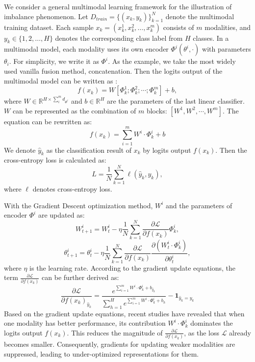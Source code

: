 We consider a general multimodal learning framework for the illustration of imbalance phenomenon. Let $D_{train} = \{(x_k,y_k)\}_{k=1}^{N}$ denote the multimodal training dataset. Each sample $x_k = (x_k^1,x_k^2, \dots,x_k^m)$ consists of $m$ modalities, and $y_k \in \{1,2,\dots,H\}$ denotes the corresponding class label from $H$ classes.
In a multimodal model, each modality uses its own encoder $\Phi^i(\theta^i,\cdot)$ with parameters $\theta_i$. For simplicity, we write it as $\Phi^i$.
As the example, we take the most widely used vanilla fusion method, concatenation. Then the logits output of the multimodal model can be written as :
\begin{equation} \label{equ:1}
    f(x_k) = W[\Phi_k^1;\Phi_k^2;\cdots;\Phi_k^m] + b,
\end{equation}
where $W \in \mathbb{R}^{H \times \sum_i^m d_{\Phi^i}}$ and $b \in \mathbb{R}^{H}$ are the parameters of the last linear classifier. $W$ can be represented as the combination of $m$ blocks: $[W^1,W^2,\cdots,W^m]$. The equation can be rewritten as: 
\begin{equation}
    f(x_k) = \sum_{i=1}^m W^i \cdot \Phi_k^i + b    
\end{equation}
We denote $\hat{y}_k$ as the classification result of $x_k$ by logits output $f(x_k)$. Then the cross-entropy loss is calculated as:
\begin{equation}
    L = \frac{1}{N}\sum_{k=1}^N\ell(\hat{y}_k, y_k),
\end{equation}
where $\ell$ denotes cross-entropy loss. 

With the Gradient Descent optimization method, $W^i$ and the parameters of encoder $\Phi^i$ are updated as:
\begin{equation}
    W^i_{t+1} = W^i_t - \eta\frac{1}{N}\sum_{k=1}^N \frac{\partial \mathcal{L}}{\partial f(x_k)}\Phi_k^i,
\end{equation}
\begin{equation}
    \theta^i_{t+1} = \theta^i_t - \eta\frac{1}{N}\sum_{k=1}^N \frac{\partial \mathcal{L}}{\partial f(x_k)}\frac{\partial(W^i_t \cdot \Phi_k^i)}{\partial \theta^i_t},
\end{equation}
where $\eta$ is the learning rate. 
According to the gradient update equations, the term $\frac{\partial \mathcal{L}}{\partial f(x_k)}$ can be further derived as:
\begin{equation}
    \frac{\partial \mathcal{L}}{\partial f(x_k)_{\hat{y}_k}} = \frac{e^{\sum_{i=1}^m W^i\cdot\Phi_k^i + b_{\hat{y}_k}}}{\sum_{h=1}^H e^{\sum_{i=1}^m W^i\cdot\Phi_k^i + b_h}} - \mathbf{1}_{{\hat{y}_k}=y_k}
\end{equation}
Based on the gradient update equations, recent studies have revealed that when one modality has better performance, its contribution $W^i \cdot \Phi_k^i$ dominates the logits output $f(x_k)$. This reduces the magnitude of $\frac{\partial \mathcal{L}}{\partial f(x_k)}$, as the loss $\mathcal{L}$ already becomes smaller. Consequently, gradients for updating weaker modalities are suppressed, leading to under-optimized representations for them.

